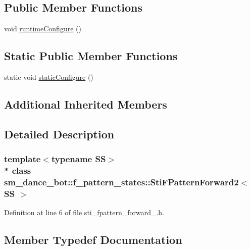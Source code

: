 \subsection*{Public Member Functions}
\begin{DoxyCompactItemize}
\item 
void \hyperlink{structsm__dance__bot_1_1f__pattern__states_1_1StiFPatternForward2_aa0f9a89b6a80ba4ff11e31a223ace103}{runtime\+Configure} ()
\end{DoxyCompactItemize}
\subsection*{Static Public Member Functions}
\begin{DoxyCompactItemize}
\item 
static void \hyperlink{structsm__dance__bot_1_1f__pattern__states_1_1StiFPatternForward2_a2bb546f83ecf369193a0a51b5c2e3f7e}{static\+Configure} ()
\end{DoxyCompactItemize}
\subsection*{Additional Inherited Members}


\subsection{Detailed Description}
\subsubsection*{template$<$typename SS$>$\\*
class sm\+\_\+dance\+\_\+bot\+::f\+\_\+pattern\+\_\+states\+::\+Sti\+F\+Pattern\+Forward2$<$ S\+S $>$}



Definition at line 6 of file sti\+\_\+fpattern\+\_\+forward\+\_.\+h.



\subsection{Member Typedef Documentation}
